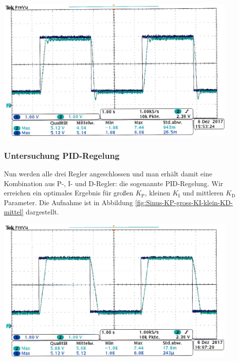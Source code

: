     \begin{center}
        \captionsetup{type=figure}
        \begin{adjustbox}{max width=\linewidth, keepaspectratio}
            \includegraphics[width=120mm]{jpg/Sinus-KP-gross-KD-klein}
        \end{adjustbox}
        \label{fig:Sinus-KP-gross-KD-klein}
    \end{center}
\endminipage
%
\subsubsection*{Untersuchung PID-Regelung}
%
Nun werden alle drei Regler angeschlossen und man erhält damit eine Kombination aus P-, I- und D-Regler: die sogenannte PID-Regelung.
Wir erreichen ein optimales Ergebnis für großen $K_{\text{P}}$, kleinen $K_{\text{I}}$ und mittleren $K_{\text{D}}$ Parameter.
Die Aufnahme ist in Abbildung \ref{fig:Sinus-KP-gross-KI-klein-KD-mittel} dargestellt.
%
\par
%
\minipage{\linewidth}
    \begin{center}
        \captionsetup{type=figure}
        \begin{adjustbox}{max width=\linewidth, keepaspectratio}
            \includegraphics[width=120mm]{jpg/Sinus-KP-gross-KI-klein-KD-mittel}
        \end{adjustbox}
        \label{fig:Sinus-KP-gross-KI-klein-KD-mittel}
    \end{center}
\endminipage
%
